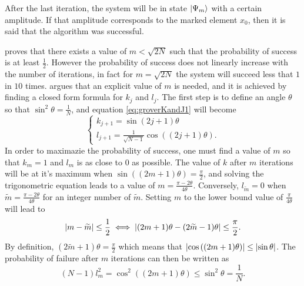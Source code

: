 \documentclass[../../dissertation.tex]{subfiles}
\begin{document}
After the last iteration, the system will be in state $\ket{\Psi_m}$ with a certain amplitude. If that amplitude corresponds to the marked element $x_0$, then it is said that the algorithm was successful.\par
\cite{grover1996} proves that there exists a value of $m < \sqrt{2N}$ such that the probability of success is at least $\frac{1}{2}$. However the probability of success does not linearly increase with the number of iterations, in fact for $m=\sqrt{2N}$ the system will succeed less that $1$ in $10$ times. \cite{boyer1996} argues that an explicit value of $m$ is needed, and it is achieved by finding a closed form formula for $k_j$ and $l_j$. The first step is to define an angle $\theta$ so that $\sin^2\theta = \frac{1}{N}$, and equation \ref{eq:groverKandJ1} will become
\begin{equation}
	\begin{cases}
		k_{j+1} = \sin{(2j+1)\theta} 
		\\l_{j+1} = \frac{1}{\sqrt{N-1}}\cos{((2j+1)\theta)}.
	\end{cases}\label{eq:groverKandJ2}
\end{equation}
In order to maximazie the probability of success, one must find a value of $m$ so that $k_m = 1$ and $l_m$ is as close to $0$ as possible. The value of $k$ after $m$ iterations will be at it's maximum when $\sin{((2m+1)\theta)} = \frac{\pi}{2}$, and solving the trigonometric equation leads to a value of $m = \frac{\pi-2\theta}{4\theta}$. Conversely, $l_{\widetilde{m}} = 0$ when $\widetilde{m} = \frac{\pi-2\theta}{4\theta}$ for an integer number of $\widetilde{m}$. Setting $m$ to the lower bound value of $\frac{\pi}{4\theta}$ will lead to
\begin{equation}
	\abs{m-\widetilde{m}} \leq \frac{1}{2} \iff \abs{(2m+1)\theta - (2\widetilde{m}-1)\theta} \leq \frac{\pi}{2}.
\end{equation}
By definition, $(2\widetilde{m}+1)\theta = \frac{\pi}{2}$ which means that $\abs{\cos{((2m+1)}\theta)} \leq \abs{\sin{\theta}}$. The probability of failure after $m$ iterations can then be written as
\begin{equation}
	(N-1)l_m^2 = \cos^2{((2m+1)\theta)} \leq \sin^2\theta = \frac{1}{N}.
\end{equation}
\end{document}
